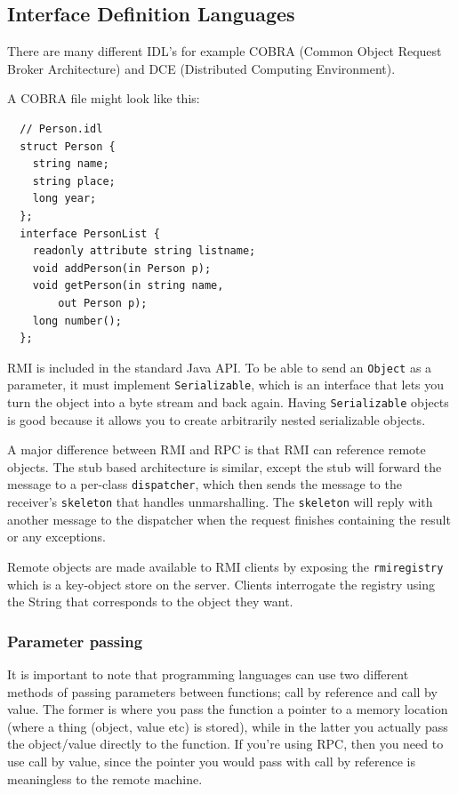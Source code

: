 \subsection{Interface Definition Languages}

There are many different IDL's for example COBRA (Common Object Request Broker
Architecture) and DCE (Distributed Computing Environment).

A COBRA file might look like this:

\begin{lstlisting}
  // Person.idl
  struct Person {
    string name; 
    string place;
    long year;
  };
  interface PersonList {
    readonly attribute string listname;
    void addPerson(in Person p);
    void getPerson(in string name, 
        out Person p);
    long number();
  };
\end{lstlisting}

RMI is included in the standard Java API. To be able to send an \texttt{Object}
as a parameter, it must implement \texttt{Serializable}, which is an interface
that lets you turn the object into a byte stream and back again. Having
\texttt{Serializable} objects is good because it allows you to create
arbitrarily nested serializable objects.

A major difference between RMI and RPC is that RMI can reference remote objects.
The stub based architecture is similar, except the stub will forward the message
to a per-class \texttt{dispatcher}, which then sends the message to the
receiver's \texttt{skeleton} that handles unmarshalling. The \texttt{skeleton}
will reply with another message to the dispatcher when the request finishes
containing the result or any exceptions.

Remote objects are made available to RMI clients by exposing the
\texttt{rmiregistry} which is a key-object store on the server. Clients
interrogate the registry using the String that corresponds to the object they
want.

\subsubsection{Parameter passing}

It is important to note that programming languages can use two different methods
of passing parameters between functions; call by reference and call by value.
The former is where you pass the function a pointer to a memory location (where
a thing (object, value etc) is stored), while in the latter you actually pass
the object/value directly to the function. If you're using RPC, then you need to
use call by value, since the pointer you would pass with call by reference is
meaningless to the remote machine.

